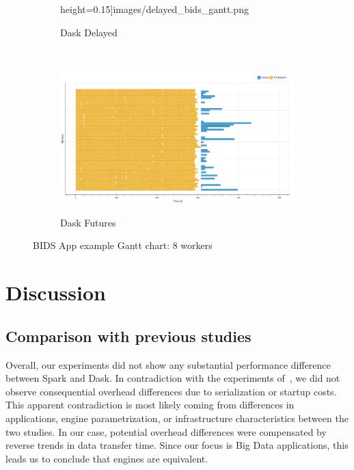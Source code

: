 \documentclass[conference]{IEEEtran}
\begin{document}
\begin{figure}[!htb]
\begin{subfigure}[b]{\columnwidth}
{        height=0.15\textheight]{images/delayed_bids_gantt.png}}
        \caption{Dask Delayed}\label{fig:bids_dask_delayed_gantt}
    \end{subfigure}
    \\
    \begin{subfigure}[b]{\columnwidth}
        \href{https://mathdugre.github.io/paper-big-data-engines/dask-futures-bids-baseline.html}{
        \includegraphics[clip,width=\columnwidth,
        height=0.15\textheight]{images/futures_bids_gantt.png}}
        \caption{Dask Futures}\label{fig:bids_dask_futures_gantt}
    \end{subfigure}
    \caption{BIDS App example Gantt chart: 8 workers}\label{fig:bids_gantt}
\end{figure}



\section{Discussion}


\subsection{Comparison with previous studies}

Overall, our experiments did not show any substantial performance
difference between Spark and Dask. In contradiction with the experiments
of~\cite{Mehta:17}, we did not observe consequential overhead differences
due to serialization or startup costs. This apparent contradiction is most
likely coming from differences in applications, engine parametrization, or
infrastructure characteristics between the two studies. In our case, potential overhead differences were
compensated by reverse trends in data transfer time. Since our focus is
Big Data applications, this leads us to conclude that engines are
equivalent.
\end{document}
